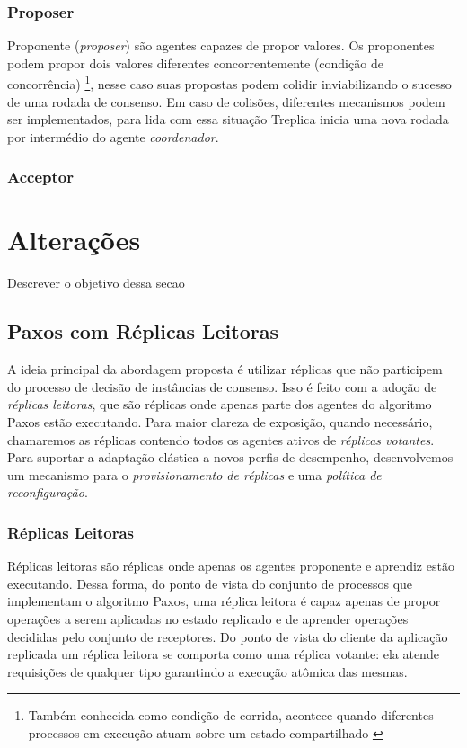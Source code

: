 \subsubsection{Proposer}

Proponente (\emph{proposer}) são agentes capazes de propor valores. Os proponentes podem
propor dois valores diferentes concorrentemente (condição de concorrência)
\footnote{Também conhecida como condição de corrida, acontece quando diferentes processos
em execução atuam sobre um estado compartilhado \cite{alguem}}, nesse caso suas propostas
podem colidir inviabilizando o sucesso de uma rodada de consenso. Em caso de colisões,
diferentes mecanismos podem ser implementados, para lida com essa situação Treplica inicia
uma nova rodada por intermédio do agente \emph{coordenador}.

\subsubsection{Acceptor}


\section{Alterações}

Descrever o objetivo dessa secao

\subsection{Paxos com Réplicas Leitoras}

A ideia principal da abordagem proposta é utilizar réplicas que não participem do processo
de decisão de instâncias de consenso. Isso é feito com a adoção de \emph{réplicas
leitoras}, que são réplicas onde apenas parte dos agentes do algoritmo Paxos estão
executando. Para maior clareza de exposição, quando necessário, chamaremos as réplicas
contendo todos os agentes ativos de \emph{réplicas votantes}. Para suportar a adaptação
elástica a novos perfis de desempenho, desenvolvemos um mecanismo para o
\emph{provisionamento de réplicas} e uma \emph{política de reconfiguração}.

\subsubsection{Réplicas Leitoras}

Réplicas leitoras são réplicas onde apenas os agentes proponente e aprendiz estão
executando. Dessa forma, do ponto de vista do conjunto de processos que implementam o
algoritmo Paxos, uma réplica leitora é capaz apenas de propor operações a serem aplicadas
no estado replicado e de aprender operações decididas pelo conjunto de receptores. Do
ponto de vista do cliente da aplicação replicada um réplica leitora se comporta como uma
réplica votante: ela atende requisições de qualquer tipo garantindo a execução atômica das
mesmas.

